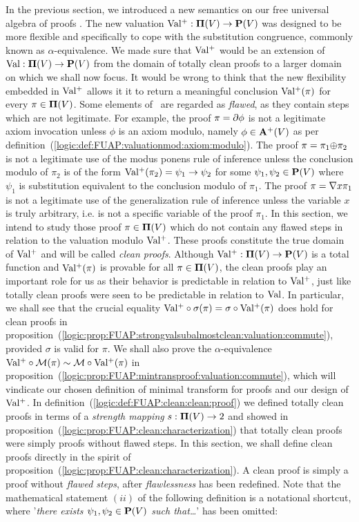In the previous section, we introduced a new semantics on our free
universal algebra of proofs \pvs. The new valuation
$\mbox{$\rm Val^{+}$}:\mbox{${\bf\Pi}(V)$}\to\mbox{${\bf P}(V)$}$ was designed to be more flexible and specifically
to cope with the substitution congruence, commonly known as
$\alpha$-equivalence. We made sure that $\mbox{$\rm Val^{+}$}$ would be an
extension of $\mbox{\rm Val}:\mbox{${\bf\Pi}(V)$}\to\mbox{${\bf P}(V)$}$ from the domain of totally clean
proofs to a larger domain on which we shall now focus. It would be
wrong to think that the new flexibility embedded in $\mbox{$\rm Val^{+}$}$ allows
it it to return a meaningful conclusion $\mbox{$\rm Val^{+}$}(\pi)$ for every
$\pi\in\mbox{${\bf\Pi}(V)$}$. Some elements of \pvs\ are regarded as {\em flawed},
as they contain steps which are not legitimate. For example, the
proof $\pi=\mbox{$\partial$}\phi$ is not a legitimate axiom invocation unless
$\phi$ is an axiom modulo, namely $\phi\in\mbox{${\bf A}^{+}(V)$}$ as per
definition~(\ref{logic:def:FUAP:valuationmod:axiom:modulo}). The
proof $\pi=\pi_{1}\mbox{$\oplus$}\pi_{2}$ is not a legitimate use of the modus
ponens rule of inference unless the conclusion modulo of $\pi_{2}$
is of the form $\mbox{$\rm Val^{+}$}(\pi_{2})=\psi_{1}\to\psi_{2}$ for some
$\psi_{1},\psi_{2}\in\mbox{${\bf P}(V)$}$ where $\psi_{1}$ is substitution
equivalent to the conclusion modulo of $\pi_{1}$. The proof
$\pi=\mbox{$\nabla$} x\pi_{1}$ is not a legitimate use of the generalization
rule of inference unless the variable $x$ is truly arbitrary, i.e.
is not a specific variable of the proof $\pi_{1}$. In this section,
we intend to study those proof $\pi\in\mbox{${\bf\Pi}(V)$}$ which do not contain any
flawed steps in relation to the valuation modulo $\mbox{$\rm Val^{+}$}$. These
proofs constitute the true domain of $\mbox{$\rm Val^{+}$}$ and will be called {\em
clean proofs}. Although $\mbox{$\rm Val^{+}$}:\mbox{${\bf\Pi}(V)$}\to\mbox{${\bf P}(V)$}$ is a total function and
$\mbox{$\rm Val^{+}$}(\pi)$ is provable for all $\pi\in\mbox{${\bf\Pi}(V)$}$, the clean proofs play
an important role for us as their behavior is predictable in
relation to $\mbox{$\rm Val^{+}$}$, just like totally clean proofs were seen to be
predictable in relation to $\mbox{\rm Val}$. In particular, we shall see that
the crucial equality $\mbox{$\rm Val^{+}$}\circ\sigma(\pi)=\sigma\circ\mbox{$\rm Val^{+}$}(\pi)$
does hold for clean proofs in
proposition~(\ref{logic:prop:FUAP:strongvalsubalmostclean:valuation:commute}),
provided $\sigma$ is valid for $\pi$. We shall also prove the
$\alpha$-equivalence $\mbox{$\rm Val^{+}$}\circ{\cal M}(\pi)\sim{\cal
M}\circ\mbox{$\rm Val^{+}$}(\pi)$ in
proposition~(\ref{logic:prop:FUAP:mintransproof:valuation:commute}),
which will vindicate our chosen definition of minimal transform for
proofs and our design of $\mbox{$\rm Val^{+}$}$. In
definition~(\ref{logic:def:FUAP:clean:clean:proof}) we defined
totally clean proofs in terms of a {\em strength mapping} $s:\mbox{${\bf\Pi}(V)$}\to
2$ and showed in
proposition~(\ref{logic:prop:FUAP:clean:characterization}) that
totally clean proofs were simply proofs without flawed steps. In
this section, we shall define clean proofs directly in the spirit of
proposition~(\ref{logic:prop:FUAP:clean:characterization}). A clean
proof is simply a proof without {\em flawed steps}, after {\em
flawlessness} has been redefined. Note that the mathematical
statement $(ii)$ of the following definition is a notational
shortcut, where '{\em there exists $\psi_{1},\psi_{2}\in\mbox{${\bf P}(V)$}$ such
that\ldots}' has been omitted:

